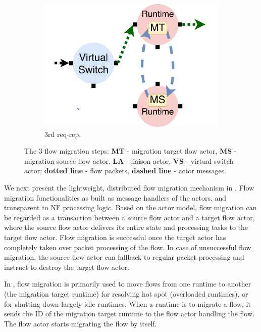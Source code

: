 \begin{figure}[!t]
  \begin{subfigure}[t]{0.33\linewidth}
 \centering
   \includegraphics[width=\columnwidth]{figure/nfactor-mig3.pdf}
   \caption{3rd req-rep.}\label{fig:mig3} \end{subfigure}\hfill
 \caption{The 3 flow migration steps: \textbf{MT} - migration target flow actor, \textbf{MS} - migration source flow actor, \textbf{LA} - liaison actor, \textbf{VS} - virtual switch actor; \textbf{dotted line} - flow packets, \textbf{dashed line} - actor messages.}
\label{fig:mig}
\end{figure}

We next present the lightweight, distributed flow migration mechanism in \nfactor. Flow migration functionalities as built as message handlers of the actors, and transparent to NF processing logic. Based on the actor model, flow migration can be regarded as a transaction between a source flow actor and a target flow actor, where the source flow actor delivers its entire state and processing tasks to the target flow actor. Flow migration is successful once the target actor has completely taken over packet processing of the flow. %
 In case of unsuccessful flow migration, the source flow actor can fallback to regular packet processing and instruct to destroy the target flow actor.
 
In \nfactor, flow migration is primarily used to move flows from one runtime to another (the migration target runtime) for resolving hot spot (overloaded runtimes), or for shutting down largely idle runtimes.  When a runtime is to migrate a flow,  %
 it sends the ID of the migration target runtime to the flow actor handling the flow. The flow actor starts migrating the flow by itself. %
 

